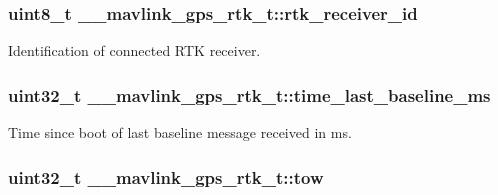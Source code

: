 \hypertarget{struct____mavlink__gps__rtk__t_ab5d3c64c1938509de9b8c355033c7700}{
\subsubsection[{rtk\+\_\+receiver\+\_\+id}]{\setlength{\rightskip}{0pt plus 5cm}uint8\+\_\+t \+\_\+\+\_\+mavlink\+\_\+gps\+\_\+rtk\+\_\+t\+::rtk\+\_\+receiver\+\_\+id}}\label{struct____mavlink__gps__rtk__t_ab5d3c64c1938509de9b8c355033c7700}


Identification of connected R\+T\+K receiver. 

\hypertarget{struct____mavlink__gps__rtk__t_a1d9284c69d15af78d221384f10f8622f}{
\subsubsection[{time\+\_\+last\+\_\+baseline\+\_\+ms}]{\setlength{\rightskip}{0pt plus 5cm}uint32\+\_\+t \+\_\+\+\_\+mavlink\+\_\+gps\+\_\+rtk\+\_\+t\+::time\+\_\+last\+\_\+baseline\+\_\+ms}}\label{struct____mavlink__gps__rtk__t_a1d9284c69d15af78d221384f10f8622f}


Time since boot of last baseline message received in ms. 

\hypertarget{struct____mavlink__gps__rtk__t_aa768e5f8cfb96b71f6e128e9936c29ca}{
\subsubsection[{tow}]{\setlength{\rightskip}{0pt plus 5cm}uint32\+\_\+t \+\_\+\+\_\+mavlink\+\_\+gps\+\_\+rtk\+\_\+t\+::tow}}\label{struct____mavlink__gps__rtk__t_aa768e5f8cfb96b71f6e128e9936c29ca}


